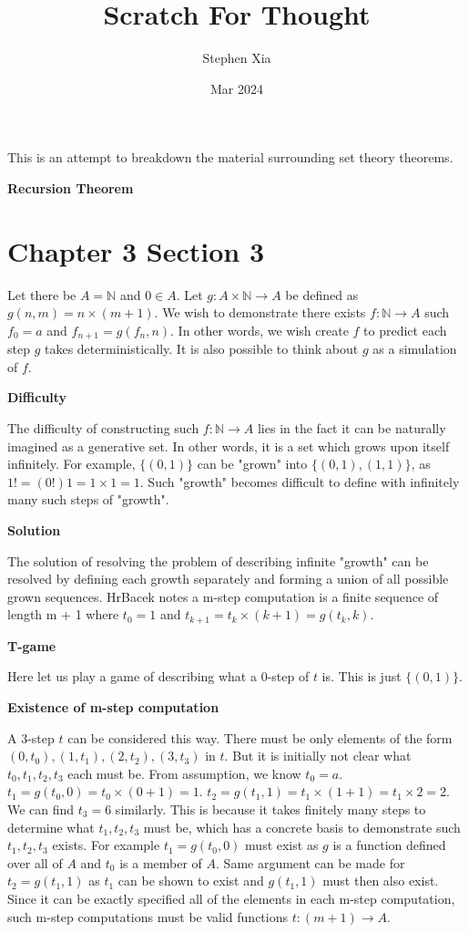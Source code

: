 \documentclass{article}
\title{Scratch For Thought}
\author{Stephen Xia}
\date{Mar 2024}
\begin{document}
\maketitle

This is an attempt to breakdown the material surrounding set theory theorems.

\medskip
\textbf{Recursion Theorem}
\medskip

\section{Chapter 3 Section 3}

Let there be $A = \mathbb{N}$ and $0 \in A$. Let $g: A \times \mathbb{N} \xrightarrow{} A$ be defined as $g(n, m) = n \times (m + 1)$. We wish to demonstrate there exists $f: \mathbb{N} \xrightarrow{} A$ such $f_0 = a$ and $f_{n + 1} = g(f_n, n)$. In other words, we wish create $f$ to predict each step $g$ takes deterministically. It is also possible to think about $g$ as a simulation of $f$.

\medskip
\textbf{Difficulty}
\medskip

The difficulty of constructing such $f: \mathbb{N} \xrightarrow{} A$ lies in the fact it can be naturally imagined as a generative set. In other words, it is a set which grows upon itself infinitely. For example, $\{(0,1)\}$ can be "grown" into $\{(0,1),(1,1)\}$, as $1! = (0!) 1 = 1 \times 1 = 1$. Such "growth" becomes difficult to define with infinitely many such steps of "growth".

\medskip
\textbf{Solution}
\medskip

The solution of resolving the problem of describing infinite "growth" can be resolved by defining each growth separately and forming a union of all possible grown sequences. HrBacek notes a m-step computation is a finite sequence of length m + 1 where $t_0 = 1$ and $t_{k + 1} = t_k \times (k + 1) = g(t_k, k)$. 

\medskip
\textbf{T-game}
\medskip

Here let us play a game of describing what a 0-step of $t$ is. This is just $\{(0,1)\}$. 

\medskip
\textbf{Existence of m-step computation}
\medskip

A 3-step $t$ can be considered this way. There must be only elements of the form $(0,t_0), (1,t_1), (2,t_2), (3,t_3)$ in $t$. But it is initially not clear what $t_0, t_1, t_2, t_3$ each must be. From assumption, we know $t_0 = a$. $t_1 = g(t_0, 0) = t_0 \times (0 + 1) = 1$. $t_2 = g(t_1, 1) = t_1 \times (1 + 1) = t_1 \times 2 = 2$. We can find $t_3 = 6$ similarly. This is because it takes finitely many steps to determine what $t_1, t_2, t_3$ must be, which has a concrete basis to demonstrate such $t_1, t_2, t_3$ exists. For example $t_1 = g(t_0, 0)$ must exist as $g$ is a function defined over all of $A$ and $t_0$ is a member of $A$. Same argument can be made for $t_2 = g(t_1, 1)$ as $t_1$ can be shown to exist and $g(t_1, 1)$ must then also exist. Since it can be exactly specified all of the elements in each m-step computation, such m-step computations must be valid functions $t: (m + 1) \xrightarrow{} A$.
\end{document}
